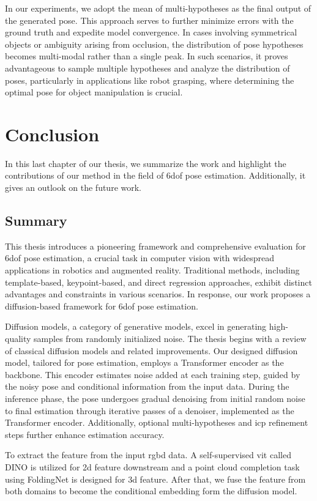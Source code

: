 \documentclass[12pt,DIV14,BCOR12mm,a4paper,footinclude=false,headinclude,parskip=half-,twoside,openright,cleardoublepage=empty,toc=index,bibliography=totoc,listof=totoc]{scrreprt}
\numberwithin{equation}{chapter}
\begin{document}
In our experiments, we adopt the mean of multi-hypotheses as the final output of the generated pose. This approach serves to further minimize errors with the ground truth and expedite model convergence. In cases involving symmetrical objects or ambiguity arising from occlusion, the distribution of pose hypotheses becomes multi-modal rather than a single peak. In such scenarios, it proves advantageous to sample multiple hypotheses and analyze the distribution of poses, particularly in applications like robot grasping, where determining the optimal pose for object manipulation is crucial.

\chapter{Conclusion}
In this last chapter of our thesis, we summarize the work and highlight the contributions of our method in the field of \gls{6dof} pose estimation. Additionally, it gives an outlook on the future work.
\section{Summary}
This thesis introduces a pioneering framework and comprehensive evaluation for \gls{6dof} pose estimation, a crucial task in computer vision with widespread applications in robotics and augmented reality. Traditional methods, including template-based, keypoint-based, and direct regression approaches, exhibit distinct advantages and constraints in various scenarios. In response, our work proposes a diffusion-based framework for \gls{6dof} pose estimation.

Diffusion models, a category of generative models, excel in generating high-quality samples from randomly initialized noise. The thesis begins with a review of classical diffusion models and related improvements. Our designed diffusion model, tailored for pose estimation, employs a Transformer encoder as the backbone. This encoder estimates noise added at each training step, guided by the noisy pose and conditional information from the input data. During the inference phase, the pose undergoes gradual denoising from initial random noise to final estimation through iterative passes of a denoiser, implemented as the Transformer encoder. Additionally, optional multi-hypotheses and \gls{icp} refinement steps further enhance estimation accuracy.

To extract the feature from the input \gls{rgbd} data. A self-supervised \gls{vit} called DINO \cite{caron2021emerging} is utilized for \gls{2d} feature downstream and a point cloud completion task using FoldingNet \cite{yang2018foldingnet} is designed for \gls{3d} feature. After that, we fuse the feature from both domains to become the conditional embedding form the diffusion model.
\end{document}
